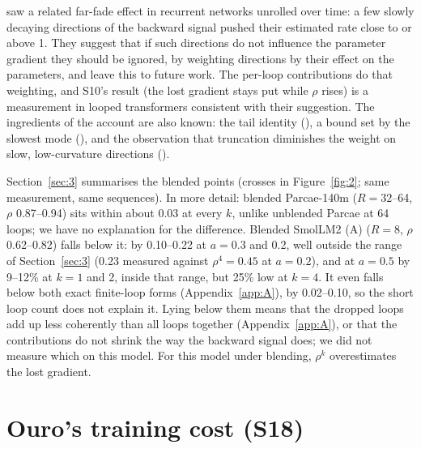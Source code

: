 \documentclass[10pt]{article}
\begin{document}
\citet[Sec.~5.4]{aicher2019} saw a related far-fade effect in recurrent networks unrolled over time: a few slowly decaying directions of the backward signal pushed their estimated rate close to or above 1. They suggest that if such directions do not influence the parameter gradient they should be ignored, by weighting directions by their effect on the parameters, and leave this to future work. The per-loop contributions do that weighting, and S10's result (the lost gradient stays put while $\rho$ rises) is a measurement in looped transformers consistent with their suggestion. The ingredients of the account are also known: the tail identity (\citealp[App., eq.~9]{liao2018}), a bound set by the slowest mode (\citealp[Prop.~3.1, eq.~10]{shaban2019}), and the observation that truncation diminishes the weight on slow, low-curvature directions (\citealp[Sec.~3.3.1]{vicol2022}).

Section~\ref{sec:3} summarises the blended points (crosses in Figure~\ref{fig:2}; same measurement, same sequences). In more detail: blended Parcae-140m ($R = 32$--64, $\rho$ 0.87--0.94) sits within about 0.03 at every $k$, unlike unblended Parcae at 64 loops; we have no explanation for the difference. Blended SmolLM2 (A) ($R = 8$, $\rho$ 0.62--0.82) falls below it: by 0.10--0.22 at $a = 0.3$ and 0.2, well outside the range of Section~\ref{sec:3} (0.23 measured against $\rho^{4} = 0.45$ at $a = 0.2$), and at $a = 0.5$ by 9--12\% at $k = 1$ and 2, inside that range, but 25\% low at $k = 4$. It even falls below both exact finite-loop forms (Appendix~\ref{app:A}), by 0.02--0.10, so the short loop count does not explain it. Lying below them means that the dropped loops add up less coherently than all loops together (Appendix~\ref{app:A}), or that the contributions do not shrink the way the backward signal does; we did not measure which on this model. For this model under blending, $\rho^{k}$ overestimates the lost gradient.

\section{Ouro's training cost (S18)}\label{app:K}
\end{document}
